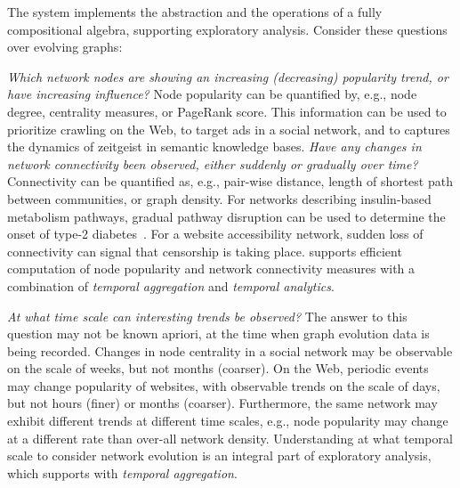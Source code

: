 
The \ql system implements the \tg abstraction and the operations of a
fully compositional algebra, supporting exploratory analysis. 
Consider these questions over evolving graphs:

{\em Which network nodes are showing an increasing (decreasing) popularity trend,
  or have increasing influence?}
Node popularity can be quantified by, e.g., node degree, centrality measures,
or PageRank score.  This information can be used to prioritize
crawling on the Web, to target ads in a social network, and to
captures the dynamics of zeitgeist in semantic knowledge bases.
%
{\em Have any changes in network connectivity been observed, either
  suddenly or gradually over time?} Connectivity can be quantified as,
e.g., pair-wise distance, length of shortest path between communities,
or graph density.  For networks describing insulin-based metabolism
pathways, gradual pathway disruption can be used to determine the
onset of type-2 diabetes~\cite{DBLP:journals/tcsb/BeyerTLSF10}.  For a
website accessibility network, sudden loss of connectivity can signal
that censorship is taking place.
%
\ql supports efficient computation of node popularity and network
connectivity measures with a combination of {\em temporal aggregation}
and {\em temporal analytics}.

{\em At what time scale can interesting trends be observed?} The
answer to this question may not be known apriori, at the time when
graph evolution data is being recorded.  Changes in node centrality in
a social network may be observable on the scale of weeks, but not
months (coarser).  On the Web, periodic events may change popularity
of websites, with observable trends on the scale of days, but not
hours (finer) or months (coarser).  Furthermore, the same network may
exhibit different trends at different time scales, e.g., node
popularity may change at a different rate than over-all network
density.  Understanding at what temporal scale to consider network
evolution is an integral part of exploratory analysis, which \ql
supports with {\em temporal aggregation}.

